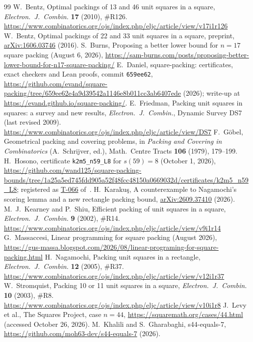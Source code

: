 \documentclass[11pt]{amsart}
\theoremstyle{remark}
\begin{document}
\begin{thebibliography}{99}
 W.~Bentz, Optimal packings of 13 and 46 unit squares in a square, \emph{Electron.\ J.\ Combin.}
\textbf{17} (2010), \#R126.
\url{https://www.combinatorics.org/ojs/index.php/eljc/article/view/v17i1r126}
 W.~Bentz, Optimal packings of 22 and 33 unit squares in a square, preprint,
\href{https://arxiv.org/abs/1606.03746}{arXiv:1606.03746} (2016).
 S.~Burns, Proposing a better lower bound for $n=17$ square packing (August 6, 2026),
\url{https://sam-burns.com/posts/proposing-better-lower-bound-for-n17-square-packing/}
 E.~Daniel, square-packing: certificates, exact checkers and Lean proofs, commit \texttt{659ee62},
\url{https://github.com/evand/square-packing/tree/659ee62e4a9d39542a1146e8b011cc3ab6407ede} (2026);
write-up at \url{https://evand.github.io/square-packing/}.
 E.~Friedman, Packing unit squares in squares: a survey and new results,
\emph{Electron.\ J.\ Combin.}, Dynamic Survey DS7 (last revised 2009).
\url{https://www.combinatorics.org/ojs/index.php/eljc/article/view/DS7}
 F.~G\"obel, Geometrical packing and covering problems, in \emph{Packing and Covering in
Combinatorics} (A.~Schrijver, ed.), Math.\ Centre Tracts \textbf{106} (1979), 179--199.
 H.~Hosono, certificate \texttt{k2m5\_n59\_L8} for $s(59)=8$ (October 1, 2026),
\url{https://github.com/wand125/square-packing-bounds/tree/1a25a5ed745fdd905a52f48fcc48150a0669032d/certificates/k2m5_n59_L8};
registered as \href{https://squaremath.org/result/t-066.html}{T-066} of~\cite{case44}.
 H.~Karaku\c{s}, A counterexample to Nagamochi's scoring lemma and a new rectangle packing
bound, \href{https://arxiv.org/abs/2609.37410}{arXiv:2609.37410} (2026).
 M.~J.~Kearney and P.~Shiu, Efficient packing of unit squares in a square, \emph{Electron.\ J.\
Combin.} \textbf{9} (2002), \#R14. \url{https://www.combinatorics.org/ojs/index.php/eljc/article/view/v9i1r14}
\bibitem{massaccesi} G.~Massaccesi, Linear programming for square packing (August 2026),
\url{https://gus-massa.blogspot.com/2026/08/linear-programing-for-square-packing.html}
\bibitem{nagamochi} H.~Nagamochi, Packing unit squares in a rectangle, \emph{Electron.\ J.\ Combin.}
\textbf{12} (2005), \#R37. \url{https://www.combinatorics.org/ojs/index.php/eljc/article/view/v12i1r37}
\bibitem{stromquist} W.~Stromquist, Packing 10 or 11 unit squares in a square, \emph{Electron.\ J.\ Combin.}
\textbf{10} (2003), \#R8. \url{https://www.combinatorics.org/ojs/index.php/eljc/article/view/v10i1r8}
\bibitem{case44} J.~Levy et al., The Squares Project, case $n=44$, \url{https://squaremath.org/cases/44.html}
(accessed October 26, 2026).
 M.~Khalili and S.~Gharabaghi, s44-equals-7, \url{https://github.com/moh63-dev/s44-equals-7} (2026).
\end{thebibliography}
\end{document}
